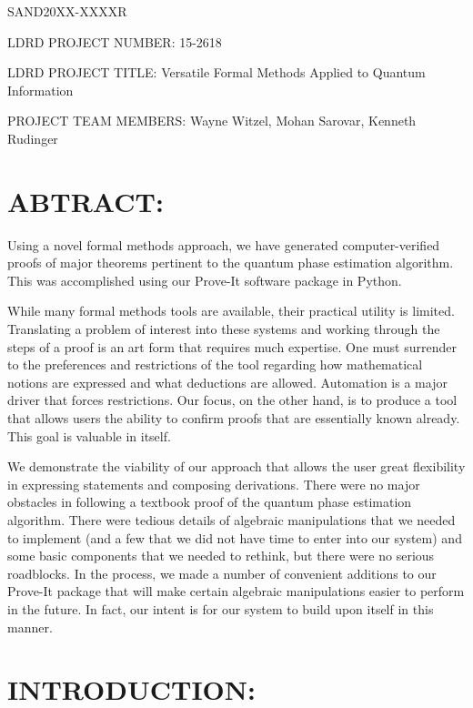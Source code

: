 \documentclass{article}[12pt]
\begin{document}
\begin{description*}
\item[SAND20XX-XXXXR]
\item[LDRD PROJECT NUMBER:] 15-2618
\item[LDRD PROJECT TITLE:] Versatile Formal Methods Applied to Quantum Information
\item[PROJECT TEAM MEMBERS:] Wayne Witzel, Mohan Sarovar, Kenneth Rudinger
\end{description*}
  
\section*{ABTRACT:}

Using a novel formal methods approach, we have generated computer-verified proofs of major theorems pertinent to the quantum phase estimation algorithm.  This was accomplished using our Prove-It software package in Python.

While many formal methods tools are available, their practical utility is limited.  Translating a problem of interest into these systems and working through the steps of a proof is an art form that requires much expertise.  One must surrender to the preferences and restrictions of the tool regarding how mathematical notions are expressed and what deductions are allowed.  Automation is a major driver that forces restrictions.  Our focus, on the other hand, is to produce a tool that allows users the ability to confirm proofs that are essentially known already.  This goal is valuable in itself.

We demonstrate the viability of our approach that allows the user great flexibility in expressing statements and composing derivations.  There were no major obstacles in following a textbook proof of the quantum phase estimation algorithm.  There were tedious details of algebraic manipulations that we needed to implement (and a few that we did not have time to enter into our system) and some basic components that we needed to rethink, but there were no serious roadblocks.  In the process, we made a number of convenient additions to our Prove-It package that will make certain algebraic manipulations easier to perform in the future.  In fact, our intent is for our system to build upon itself in this manner.


\section*{INTRODUCTION:}
\end{document}
